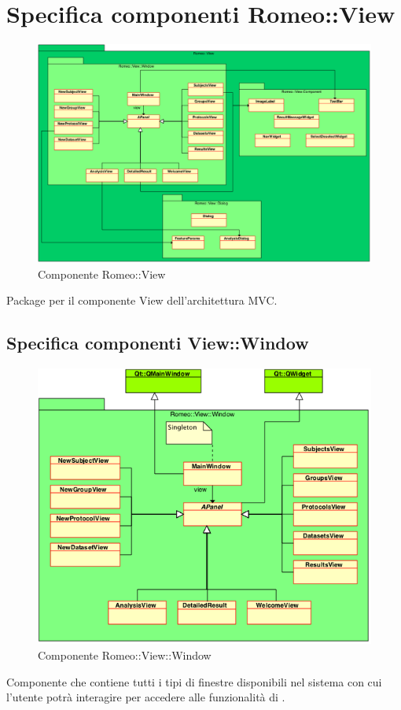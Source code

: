 \color{black}
\section{Specifica componenti Romeo::View}
\label{specificaView}
\begin{figure} [!h]
\centering
	\includegraphics[width=0.8\linewidth] {../Specifica_Tecnica/Content/Immagini/RelazioniView.png}
			\caption{Componente Romeo::View}
			\label{comp_romeo::view}
\end{figure}
Package\g{} per il componente View dell'architettura MVC.
\subsection{Specifica componenti View::Window}
\label{specificaWindow}
\begin{figure}[!h]

			\includegraphics[width=0.8\linewidth]{../Specifica_Tecnica/Content/Immagini/Window.png}
			\caption{Componente Romeo::View::Window}
			\label{comp_romeo::view::window}
\end{figure}
Componente che contiene tutti i tipi di finestre disponibili nel sistema con cui l'utente potrà interagire per accedere alle funzionalità di \project.
\pagebreak
